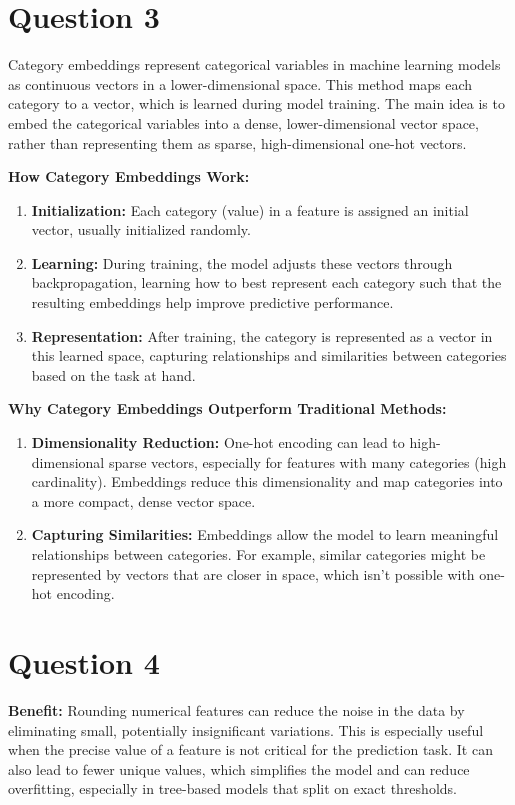 \documentclass[a4paper,12pt]{article}
\begin{document}
\section*{Question 3}
Category embeddings represent categorical variables in machine learning models as continuous vectors in a lower-dimensional space. This method maps each category to a vector, which is learned during model training. The main idea is to embed the categorical variables into a dense, lower-dimensional vector space, rather than representing them as sparse, high-dimensional one-hot vectors.

\textbf{How Category Embeddings Work:}
\begin{enumerate}
    \item \textbf{Initialization:} Each category (value) in a feature is assigned an initial vector, usually initialized randomly.
    \item \textbf{Learning:} During training, the model adjusts these vectors through backpropagation, learning how to best represent each category such that the resulting embeddings help improve predictive performance.
    \item \textbf{Representation:} After training, the category is represented as a vector in this learned space, capturing relationships and similarities between categories based on the task at hand.
\end{enumerate}

\textbf{Why Category Embeddings Outperform Traditional Methods:}

\begin{enumerate}
    \item \textbf{Dimensionality Reduction:} One-hot encoding can lead to high-dimensional sparse vectors, especially for features with many categories (high cardinality). Embeddings reduce this dimensionality and map categories into a more compact, dense vector space.
    \item \textbf{Capturing Similarities:} Embeddings allow the model to learn meaningful relationships between categories. For example, similar categories might be represented by vectors that are closer in space, which isn't possible with one-hot encoding.
\end{enumerate}

\section*{Question 4}
\textbf{Benefit:}
Rounding numerical features can reduce the noise in the data by eliminating small, potentially insignificant variations. This is especially useful when the precise value of a feature is not critical for the prediction task. It can also lead to fewer unique values, which simplifies the model and can reduce overfitting, especially in tree-based models that split on exact thresholds.
\end{document}
